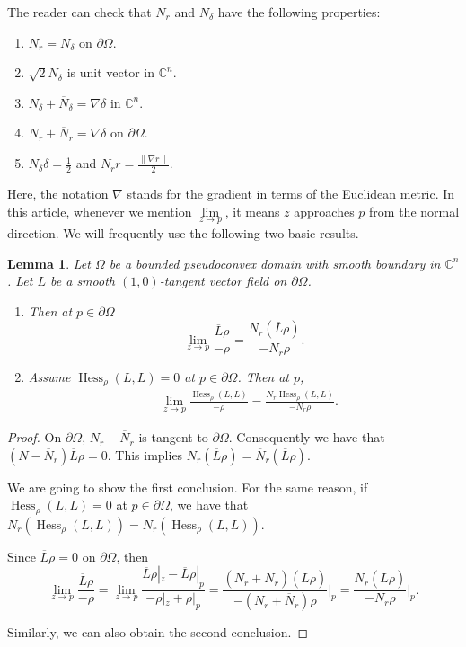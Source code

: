 \documentclass[11pt]{article}
\theoremstyle{plain} \numberwithin{equation}{section}
\newtheorem{lemma}[theorem]{Lemma}
\theoremstyle{definition}
\DeclareMathOperator{\Hessian}{Hess}
\begin{document}
The reader can check that $N_r$ and $N_\delta$ have the following properties:
\begin{enumerate}
	\item $N_r=N_\delta$ on $\partial\Omega$.
	\item $\sqrt{2}N_\delta$ is unit vector in $\mathbb{C}^n$.
	\item $N_\delta+\overline{N}_\delta=\nabla\delta$ in $\mathbb{C}^n$.
	\item $N_r+\overline{N}_r=\nabla\delta$ on $\partial\Omega$.
	\item $N_\delta\delta =\frac{1}{2}$ and $N_r r=\frac{\|\nabla r\|}{2}$.
\end{enumerate}
		 
		 Here, the notation $\nabla$ stands for the gradient in terms of the Euclidean metric. In this article, whenever we mention $\lim\limits_{z\to p}$, it means $z$ approaches $p$ from the normal direction. We will frequently use the following two basic results. 
		 
		 
		 \begin{lemma}\label{basic}
		 	Let $\Omega$ be a bounded pseudoconvex domain with smooth boundary in $\mathbb{C}^n$. Let $L$ be a smooth $(1,0)$-tangent vector field on $\partial\Omega$. 
		 	\begin{enumerate}
		 		\item Then at $p\in \partial\Omega$ \[	\lim\limits_{z\to p}\frac{\overline{L}\rho}{-\rho}=\frac{N_r(\overline{L}\rho)}{-N_r\rho}.\]
		 		\item Assume $\Hessian_\rho(L, L)=0$ at $p\in \partial\Omega$. Then at $p$,	 		\[\begin{split}
		 		&
		 		\lim\limits_{z\to p}\frac{\Hessian_\rho(L, L)}{-\rho}=\frac{N_r\Hessian_\rho(L, L)}{-N_r\rho}.
		 		\end{split}
		 		\] 
		 	\end{enumerate} 
		 	
		 \end{lemma}
	 
\begin{proof}
	On $\partial\Omega$, $N_r-\overline{N}_r$ is tangent to $\partial\Omega$. Consequently we have that $(N-\overline{N}_r)\overline{L}\rho=0$. This implies $N_r(\overline{L}\rho)=\overline{N}_r(\overline{L}\rho)$. 
	
	We are going to show the first conclusion. For the same reason, if $\Hessian_\rho(L, L)=0$ at $p\in \partial\Omega$, we have that $N_r(\Hessian_\rho(L, L))=\overline{N}_r(\Hessian_\rho(L, L))$.
	
	Since $\overline{L}\rho=0$ on $\partial\Omega$, then \[	\lim\limits_{z\to p}\frac{\overline{L}\rho}{-\rho}=\lim\limits_{z\to p}\frac{\overline{L}\rho|_z-\overline{L}\rho|_p}{-\rho|_z+\rho|_p}=\frac{(N_r+\overline{N}_r)(\overline{L}\rho)}{-(N_r+\overline{N}_r)\rho}\Bigg|_p=\frac{N_r(\overline{L}\rho)}{-N_r\rho}\Bigg|_p.\] 
	
	Similarly, we can also obtain the second conclusion.
\end{proof}
 
\end{document}
